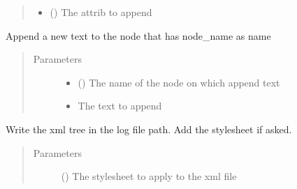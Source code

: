 \documentclass[a4paper,10pt,english]{sphinxmanual}
\begin{document}
\begin{fulllineitems}
\begin{fulllineitems}
\begin{quote}
\begin{description}
\begin{itemize}
\item {} 
 () \textendash{} The attrib to append

\end{itemize}

\end{description}\end{quote}

\end{fulllineitems}


\begin{fulllineitems}
\label{\detokenize{commands/apidoc/src:src.xmlManager.XmlLogFile.append_node_text}}
Append a new text to the node that has node\_name as name
\begin{quote}\begin{description}
\item[{Parameters}] \leavevmode\begin{itemize}
\item {} 
 () \textendash{} The name of the node on which append text

\item {} 
 \textendash{} The text to append

\end{itemize}

\end{description}\end{quote}

\end{fulllineitems}


\begin{fulllineitems}
\label{\detokenize{commands/apidoc/src:src.xmlManager.XmlLogFile.write_tree}}
Write the xml tree in the log file path. Add the stylesheet if asked.
\begin{quote}\begin{description}
\item[{Parameters}] \leavevmode
{} () \textendash{} The stylesheet to apply to the xml file

\end{description}\end{quote}

\end{fulllineitems}


\end{fulllineitems}
\end{document}
